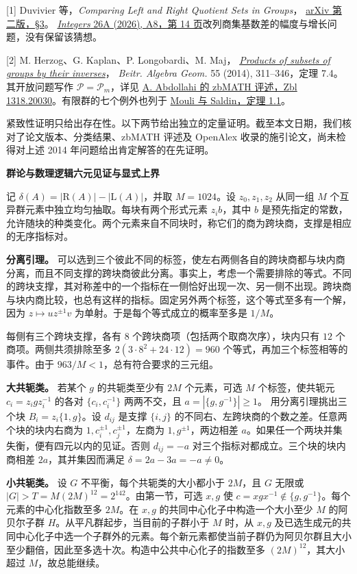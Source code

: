 \documentclass[11pt,a4paper]{article}
\newcommand{\head}[1]{\vspace*{2mm}{\color{green}\large\bfseries #1}\par}
\newcommand{\banner}[1]{{\small\color{green}\bfseries 群论与数理逻辑\hfill #1}\par\vspace{-3pt}{\color{rulecol}\rule{\linewidth}{0.7pt}}\par}
\newcommand{\R}{\mathrm R}
\newcommand{\Lq}{\mathrm L}
\begin{document}
\head{文献与范围}
{\small
[1] Duvivier 等，\textit{Comparing Left and Right Quotient Sets in Groups}，
\href{https://arxiv.org/html/2509.00611v2#S3}{arXiv 第二版，§3}。
\href{https://math.colgate.edu/~integers/aap8/aap8.pdf}{\textit{Integers} 26A (2026), A8，第 14 页}改列商集基数差的幅度与增长问题，没有保留该猜想。

[2] M. Herzog、G. Kaplan、P. Longobardi、M. Maj，
\href{https://doi.org/10.1007/s13366-013-0141-y}{\textit{Products of subsets of groups by their inverses}}，
\textit{Beitr. Algebra Geom.} 55 (2014), 311–346，定理 7.4。
其开放问题写作 $\mathcal P=\mathcal P_m$，详见 \href{https://api.zbmath.org/v1/document/6362499}{A. Abdollahi 的 zbMATH 评述，Zbl 1318.20030}。有限群的七个例外也列于 \href{https://arxiv.org/html/2509.04717v2#S1}{Mouli 与 Saldin，定理 1.1}。

紧致性证明只给出存在性。以下两节给出独立的定量证明。截至本文日期，我们核对了论文版本、分类结果、zbMATH 评述及 OpenAlex 收录的施引论文，尚未检得对上述 2014 年问题给出肯定解答的在先证明。}
\newpage
\banner{六元见证与显式上界}
\head{四、三个二元块的计数}
记 $\delta(A)=|\R(A)|-|\Lq(A)|$，并取 $M=1024$。设 $z_0,z_1,z_2$ 从同一组 $M$ 个互异群元素中独立均匀抽取。每块有两个形式元素 $z_i b$，其中 $b$ 是预先指定的常数，允许随块的种类变化。两个元素来自不同块时，称它们的商为跨块商，支撑是相应的无序指标对。

\textbf{分离引理。} 可以选到三个彼此不同的标签，使左右两侧各自的跨块商都与块内商分离，而且不同支撑的跨块商彼此分离。事实上，考虑一个需要排除的等式。不同的跨块支撑，其对称差中的一个指标在一侧恰好出现一次、另一侧不出现。跨块商与块内商比较，也总有这样的指标。固定另外两个标签，这个等式至多有一个解，因为 $z\mapsto uz^{\pm1}v$ 为单射。于是每个等式成立的概率至多是 $1/M$。

每侧有三个跨块支撑，各有 $8$ 个跨块商项（包括两个取商次序），块内只有 $12$ 个商项。两侧共须排除至多 $2(3\cdot8^2+24\cdot12)=960$ 个等式，再加三个标签相等的事件。由于 $963/M<1$，总有符合要求的三元组。

\textbf{大共轭类。} 若某个 $g$ 的共轭类至少有 $2M$ 个元素，可选 $M$ 个标签，使共轭元 $c_i=z_i g z_i^{-1}$ 的各对 $\{c_i,c_i^{-1}\}$ 两两不交，且 $a=|\{g,g^{-1}\}|\ge1$。
用分离引理挑出三个块 $B_i=z_i\{1,g\}$。设 $d_{ij}$ 是支撑 $\{i,j\}$ 的不同右、左跨块商的个数之差。任意两个块的块内右商为 $1,c_i^{\pm1},c_j^{\pm1}$，左商为 $1,g^{\pm1}$，两边相差 $a$。如果任一个两块并集失衡，便有四元以内的见证。否则 $d_{ij}=-a$ 对三个指标对都成立。三个块的块内商相差 $2a$，其并集因而满足 $\delta=2a-3a=-a\ne0$。

\textbf{小共轭类。} 设 $G$ 不平衡，每个共轭类的大小都小于 $2M$，且 $G$ 无限或 $|G|>T=M(2M)^{12}=2^{142}$。由第一节，可选 $x,g$ 使 $c=xgx^{-1}\notin\{g,g^{-1}\}$。每个元素的中心化指数至多 $2M$。在 $x,g$ 的共同中心化子中构造一个大小至少 $M$ 的阿贝尔子群 $H$。从平凡群起步，当目前的子群小于 $M$ 时，从 $x,g$ 及已选生成元的共同中心化子中选一个子群外的元素。每个新元素都使当前子群仍为阿贝尔群且大小至少翻倍，因此至多选十次。构造中公共中心化子的指数至多 $(2M)^{12}$，其大小超过 $M$，故总能继续。
\end{document}
